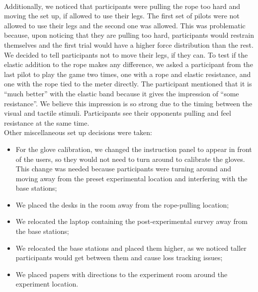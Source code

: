 \\
Additionally, we noticed that participants were pulling the rope too hard and moving the set up, if allowed to use their legs. The first set of pilots were not allowed to use their legs and the second one was allowed. This was problematic because, upon noticing that they are pulling too hard, participants would restrain themselves and the first trial would have a higher force distribution than the rest. We decided to tell participants not to move their legs, if they can. To test if the elastic addition to the rope makes any difference, we asked a participant from the last pilot to play the game two times, one with a rope and elastic resistance, and one with the rope tied to the meter directly. The participant mentioned that it is ``much better'' with the elastic band because it gives the impression of ``some resistance''. We believe this impression is so strong due to the timing between the visual and tactile stimuli. Participants see their opponents pulling and feel resistance at the same time.
\\
Other miscellaneous set up decisions were taken:
\begin{itemize}
\itemsep0em 
    \item For the glove calibration, we changed the instruction panel to appear in front of the users, so they would not need to turn around to calibrate the gloves. This change was needed because participants were turning around and moving away from the preset experimental location and interfering with the base stations;
    \item We placed the desks in the room away from the rope-pulling location;
    \item We relocated the laptop containing the post-experimental survey away from the base stations;
    \item We relocated the base stations and placed them higher, as we noticed taller participants would get between them and cause loss tracking issues;
    \item We placed papers with directions to the experiment room around the experiment location.
\end{itemize}
